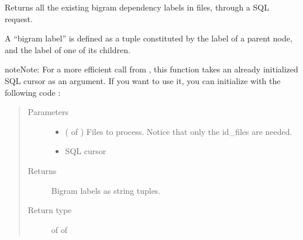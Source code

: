 \documentclass[letterpaper,10pt,english]{sphinxmanual}
\begin{document}

\begin{fulllineitems}
\label{\detokenize{analysis:loacore.analysis.frequencies.get_bigram_label_set}}
Returns all the existing bigram dependency labels in files, through a SQL request.

A “bigram label” is defined as a tuple constituted by the label of a parent node, and the label of one of its
children.

\begin{sphinxadmonition}{note}{Note:}
For a more efficient call from {\hyperref[\detokenize{analysis:loacore.analysis.frequencies.bigram_label_frequencies}]{}}, this function takes an already initialized SQL
cursor as an argument.
If you want to use it, you can initialize  with the following code :

%
\begin{sphinxVerbatim}[commandchars=\\\{\}]
   
   
  
  
\end{sphinxVerbatim}
\end{sphinxadmonition}
\begin{quote}\begin{description}
\item[{Parameters}] \leavevmode\begin{itemize}
\item {} 
 ( of ) \textendash{} Files to process. Notice that only the id\_files are needed.

\item {} 
 \textendash{} SQL cursor

\end{itemize}

\item[{Returns}] \leavevmode
Bigram labels as string tuples.

\item[{Return type}] \leavevmode
{} of  of 

\end{description}\end{quote}

\end{fulllineitems}
\end{document}
